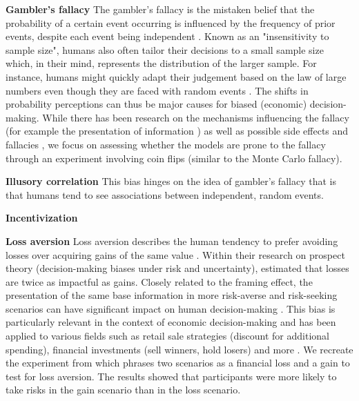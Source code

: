 \par \textbf{Gambler's fallacy} The gambler's fallacy is the mistaken belief that the probability of a certain event occurring is influenced by the frequency of prior events, despite each event being independent \parencite{bar1991perception,kovic2019gambler}. Known as an "insensitivity to sample size", humans also often tailor their decisions to a small sample size which, in their mind, represents the distribution of the larger sample. For instance, humans might quickly adapt their judgement based on the law of large numbers even though they are faced with random events \parencite{tversky1974judgment}. The shifts in probability perceptions can thus be major causes for biased (economic) decision-making. While there has been research on the mechanisms influencing the fallacy (for example the presentation of information \parencite{barron2010role}) as well as possible side effects and fallacies \parencite{kovic2019gambler}, we focus on assessing whether the models are prone to the fallacy through an experiment involving coin flips (similar to the Monte Carlo fallacy).

\par \textbf{Illusory correlation} This bias hinges on the idea of gambler's fallacy that is that humans tend to see associations between independent, random events.

\par \textbf{Incentivization} 

\par \textbf{Loss aversion} Loss aversion describes the human tendency to prefer avoiding losses over acquiring gains of the same value  \parencite{liu2023review}. Within their research on prospect theory (decision-making biases under risk and uncertainty), \textcite{tversky1992advances} estimated that losses are twice as impactful as gains. Closely related to the framing effect, the presentation of the same base information in more risk-averse and risk-seeking scenarios can have significant impact on human decision-making \parencite{druckman2001evaluating}. This bias is particularly relevant in the context of economic decision-making and has been applied to various fields such as retail sale strategies (discount for additional spending), financial investments (sell winners, hold losers) and more \parencite{liu2023review}. We recreate the experiment from \textcite{thaler2015misbehaving} which phrases two scenarios as a financial loss and a gain to test for loss aversion. The results showed that participants were more likely to take risks in the gain scenario than in the loss scenario.


